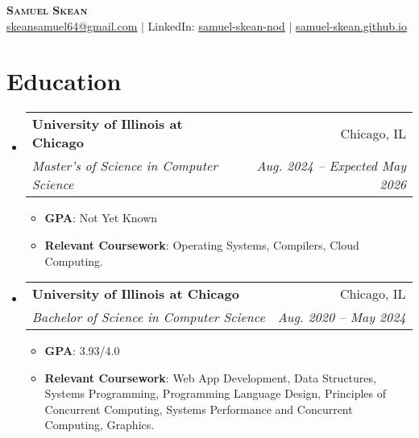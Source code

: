 \documentclass[letterpaper,11pt]{article}
\makeatletter
\newcommand{\resumeSubheading}[4]{
  \vspace{-2pt}\item
    \begin{tabular*}{0.97\textwidth}[t]{l@{\extracolsep{\fill}}r}
      \textbf{#1} & #2 \\
      \textit{\small#3} & \textit{\small #4} \\
    \end{tabular*}\vspace{-7pt}
}
\newcommand{\resumeSubHeadingListStart}{\begin{itemize}[leftmargin=0.15in, label={}]}
\newcommand{\resumeSubHeadingListEnd}{\end{itemize}}
\makeatother
\begin{document}

\begin{center}
    \textbf{\Huge \scshape Samuel Skean} \\ \vspace{1pt} \href{mailto:skeansamuel64@gmail.com}{\underline{skeansamuel64@gmail.com}} $|$ 
    LinkedIn: \href{https://www.linkedin.com/in/samuel-skean-nod/}{\underline{samuel-skean-nod}} $|$ \href{https://samuel-skean.github.io}{\underline{samuel-skean.github.io}}
\end{center}


\section{Education}
  \resumeSubHeadingListStart
    \resumeSubheading
      {University of Illinois at Chicago}{Chicago, IL}
      {Master's of Science in Computer Science}{Aug. 2024 -- Expected May 2026}
      \begin{itemize}
        \item \textbf{GPA}{: Not Yet Known}
        \item \textbf{Relevant Coursework}: Operating Systems, Compilers, Cloud Computing.
      \end{itemize}
    \resumeSubheading
      {University of Illinois at Chicago}{Chicago, IL}
      {Bachelor of Science in Computer Science}{Aug. 2020 -- May 2024}
      \begin{itemize}
        \item \textbf{GPA}{: 3.93/4.0}
        \item \textbf{Relevant Coursework}: Web App Development, Data Structures, Systems Programming, Programming Language Design, Principles of Concurrent Computing, Systems Performance and Concurrent Computing, Graphics.
      \end{itemize}
  \resumeSubHeadingListEnd
\end{document}
